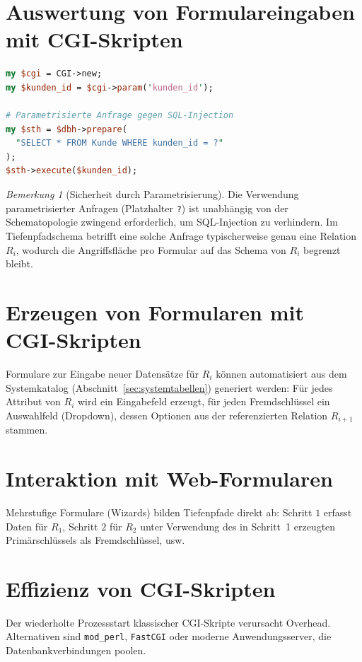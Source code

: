 ﻿\documentclass[a4paper,12pt]{report}
\theoremstyle{definition}
\theoremstyle{remark}
\newtheorem{remark}{Bemerkung}[chapter]
\begin{document}
\section{Auswertung von Formulareingaben mit CGI-Skripten}

\begin{lstlisting}[language=Perl]
my $cgi = CGI->new;
my $kunden_id = $cgi->param('kunden_id');

# Parametrisierte Anfrage gegen SQL-Injection
my $sth = $dbh->prepare(
  "SELECT * FROM Kunde WHERE kunden_id = ?"
);
$sth->execute($kunden_id);
\end{lstlisting}

\begin{remark}[Sicherheit durch Parametrisierung]
Die Verwendung parametrisierter Anfragen (Platzhalter \texttt{?}) ist
unabhängig von der Schematopologie zwingend erforderlich, um
SQL-Injection zu verhindern. Im Tiefenpfadschema betrifft eine solche
Anfrage typischerweise genau eine Relation $R_i$, wodurch die
Angriffsfläche pro Formular auf das Schema von $R_i$ begrenzt bleibt.
\end{remark}

\section{Erzeugen von Formularen mit CGI-Skripten}

Formulare zur Eingabe neuer Datensätze für $R_i$ können automatisiert
aus dem Systemkatalog (Abschnitt~\ref{sec:systemtabellen}) generiert
werden: Für jedes Attribut von $R_i$ wird ein Eingabefeld erzeugt, für
jeden Fremdschlüssel ein Auswahlfeld (Dropdown), dessen Optionen aus
der referenzierten Relation $R_{i+1}$ stammen.

\section{Interaktion mit Web-Formularen}

Mehrstufige Formulare (Wizards) bilden Tiefenpfade direkt ab: Schritt
$1$ erfasst Daten für $R_1$, Schritt $2$ für $R_2$ unter Verwendung des
in Schritt~1 erzeugten Primärschlüssels als Fremdschlüssel, usw.

\section{Effizienz von CGI-Skripten}

Der wiederholte Prozessstart klassischer CGI-Skripte verursacht
Overhead. Alternativen sind \texttt{mod\_perl}, \texttt{FastCGI} oder
moderne Anwendungsserver, die Datenbankverbindungen poolen.
\end{document}
